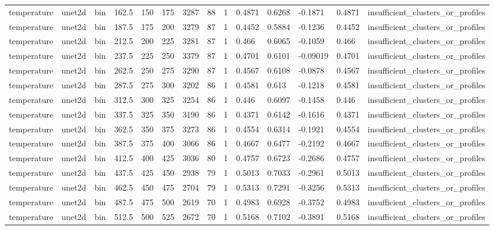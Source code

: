 \begin{table}[htbp]
\begin{tabular}{llllllllllllll}
temperature & unet2d & bin & 162.5 & 150 & 175 & 3287 & 88 & 1 & 0.4871 & 0.6268 & -0.1871 & 0.4871 & insufficient\_clusters\_or\_profiles \\
temperature & unet2d & bin & 187.5 & 175 & 200 & 3279 & 87 & 1 & 0.4452 & 0.5884 & -0.1236 & 0.4452 & insufficient\_clusters\_or\_profiles \\
temperature & unet2d & bin & 212.5 & 200 & 225 & 3281 & 87 & 1 & 0.466 & 0.6065 & -0.1059 & 0.466 & insufficient\_clusters\_or\_profiles \\
temperature & unet2d & bin & 237.5 & 225 & 250 & 3379 & 87 & 1 & 0.4701 & 0.6101 & -0.09019 & 0.4701 & insufficient\_clusters\_or\_profiles \\
temperature & unet2d & bin & 262.5 & 250 & 275 & 3290 & 87 & 1 & 0.4567 & 0.6108 & -0.0878 & 0.4567 & insufficient\_clusters\_or\_profiles \\
temperature & unet2d & bin & 287.5 & 275 & 300 & 3202 & 86 & 1 & 0.4581 & 0.613 & -0.1218 & 0.4581 & insufficient\_clusters\_or\_profiles \\
temperature & unet2d & bin & 312.5 & 300 & 325 & 3254 & 86 & 1 & 0.446 & 0.6097 & -0.1458 & 0.446 & insufficient\_clusters\_or\_profiles \\
temperature & unet2d & bin & 337.5 & 325 & 350 & 3190 & 86 & 1 & 0.4371 & 0.6142 & -0.1616 & 0.4371 & insufficient\_clusters\_or\_profiles \\
temperature & unet2d & bin & 362.5 & 350 & 375 & 3273 & 86 & 1 & 0.4554 & 0.6314 & -0.1921 & 0.4554 & insufficient\_clusters\_or\_profiles \\
temperature & unet2d & bin & 387.5 & 375 & 400 & 3066 & 86 & 1 & 0.4667 & 0.6477 & -0.2192 & 0.4667 & insufficient\_clusters\_or\_profiles \\
temperature & unet2d & bin & 412.5 & 400 & 425 & 3036 & 80 & 1 & 0.4757 & 0.6723 & -0.2686 & 0.4757 & insufficient\_clusters\_or\_profiles \\
temperature & unet2d & bin & 437.5 & 425 & 450 & 2938 & 79 & 1 & 0.5013 & 0.7033 & -0.2961 & 0.5013 & insufficient\_clusters\_or\_profiles \\
temperature & unet2d & bin & 462.5 & 450 & 475 & 2704 & 79 & 1 & 0.5313 & 0.7291 & -0.3256 & 0.5313 & insufficient\_clusters\_or\_profiles \\
temperature & unet2d & bin & 487.5 & 475 & 500 & 2619 & 70 & 1 & 0.4983 & 0.6928 & -0.3752 & 0.4983 & insufficient\_clusters\_or\_profiles \\
temperature & unet2d & bin & 512.5 & 500 & 525 & 2672 & 70 & 1 & 0.5168 & 0.7102 & -0.3891 & 0.5168 & insufficient\_clusters\_or\_profiles \\

\end{tabular}
\end{table}
